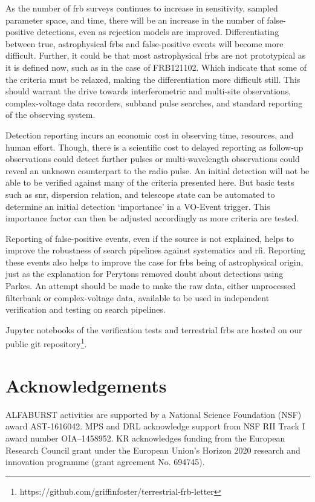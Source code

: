 \documentclass[a4paper,fleqn,usenatbib]{mnras}
\begin{document}
As the number of \gls{frb} surveys continues to increase in sensitivity, sampled
parameter space, and time, there will be an increase in the number of
false-positive detections, even as rejection models are improved.
Differentiating between true, astrophysical \glspl{frb} and false-positive
events will become more difficult.  Further, it could be that most astrophysical
\glspl{frb} are not prototypical as it is defined now, such as in the case of
FRB121102. Which indicate that some of the criteria must be relaxed,
making the differentiation more difficult still.  This should warrant the drive
towards interferometric and multi-site observations, complex-voltage data
recorders, subband pulse searches, and standard reporting of the observing
system.

Detection reporting incurs an economic cost in observing time, resources, and
human effort. Though, there is a scientific cost to delayed reporting as
follow-up observations could detect further pulses or multi-wavelength
observations could reveal an unknown counterpart to the radio pulse. An initial
detection will not be able to be verified against many of the criteria presented
here. But basic tests such as \gls{snr}, dispersion relation, and telescope
state can be automated to determine an initial detection `importance' in a
VO-Event trigger. This importance factor can then be adjusted accordingly as
more criteria are tested.

Reporting of false-positive events, even if the source is not explained, helps
to improve the robustness of search pipelines against systematics and \gls{rfi}.
Reporting these events also helps to improve the case for \glspl{frb} being of
astrophysical origin, just as the explanation for Perytons
\citep{2015MNRAS.451.3933P} removed doubt about detections using Parkes. An
attempt should be made to make the raw data, either unprocessed filterbank or
complex-voltage data, available to be used in independent verification and
testing on search pipelines.

Jupyter notebooks of the verification tests and terrestrial \glspl{frb} are
hosted on our public git
repository\footnote{https://github.com/griffinfoster/terrestrial-frb-letter}.

\section*{Acknowledgements}

ALFABURST activities are supported by a National Science Foundation
(NSF) award AST-1616042. MPS and DRL acknowledge support from NSF RII Track I
award number OIA--1458952. KR acknowledges funding from the European Research Council grant under the European Union’s Horizon 2020 research and innovation programme (grant agreement No. 694745).


 

\bsp	%
\label{lastpage}
\end{document}

